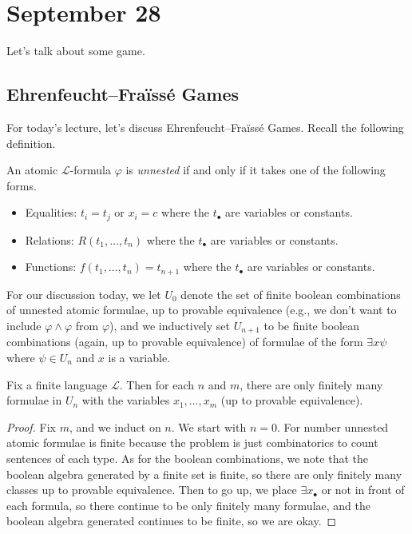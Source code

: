 \documentclass[../notes.tex]{subfiles}
\begin{document}
\section{September 28}

Let's talk about some game.

\subsection{Ehrenfeucht--Fra\"iss\'e Games}
For today's lecture, let's discuss Ehrenfeucht--Fra\"iss\'e Games. Recall the following definition.
\begin{definition}[unnested]
	An atomic $\mathcal L$-formula $\varphi$ is \textit{unnested} if and only if it takes one of the following forms.
	\begin{itemize}
		\item Equalities: $t_i=t_j$ or $x_i=c$ where the $t_\bullet$ are variables or constants.
		\item Relations: $R(t_1,\ldots,t_n)$ where the $t_\bullet$ are variables or constants.
		\item Functions: $f(t_1,\ldots,t_n)=t_{n+1}$ where the $t_\bullet$ are variables or constants.
	\end{itemize}
\end{definition}
For our discussion today, we let $U_0$ denote the set of finite boolean combinations of unnested atomic formulae, up to provable equivalence (e.g., we don't want to include $\varphi\land\varphi$ from $\varphi$), and we inductively set $U_{n+1}$ to be finite boolean combinations (again, up to provable equivalence) of formulae of the form $\exists x\psi$ where $\psi\in U_n$ and $x$ is a variable.
\begin{proposition} \label{prop:finiteness-of-u-n}
	Fix a finite language $\mathcal L$. Then for each $n$ and $m$, there are only finitely many formulae in $U_n$ with the variables $x_1,\ldots,x_m$ (up to provable equivalence).
\end{proposition}
\begin{proof}
	Fix $m$, and we induct on $n$. We start with $n=0$. For number unnested atomic formulae is finite because the problem is just combinatorics to count sentences of each type. As for the boolean combinations, we note that the boolean algebra generated by a finite set is finite,\todo{} so there are only finitely many classes up to provable equivalence. Then to go up, we place $\exists x_\bullet$ or not in front of each formula, so there continue to be only finitely many formulae, and the boolean algebra generated continues to be finite, so we are okay.
\end{proof}
\end{document}

